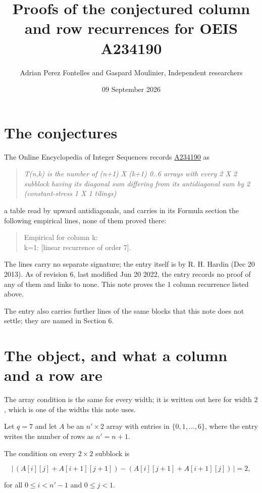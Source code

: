 \documentclass[11pt]{article}
\title{Proofs of the conjectured column and row recurrences for OEIS A234190}
\author{Adrian Perez Fontelles and Gaspard Moulinier, Independent researchers}
\date{09 September 2026}
\theoremstyle{definition}
\begin{document}
\maketitle
\section{The conjectures}

The Online Encyclopedia of Integer Sequences records \href{https://oeis.org/A234190}{A234190} as

\begin{quote}\itshape T(n,k) is the number of (n+1) X (k+1) 0..6 arrays with every 2 X 2 subblock having its diagonal sum differing from its antidiagonal sum by 2 (constant-stress 1 X 1 tilings)\end{quote}

a table read by upward antidiagonals, and carries in its Formula section the following empirical lines, none of them proved there:

\begin{quote}\ttfamily Empirical for column k:\\
k=1: [linear recurrence of order 7].\end{quote}

The lines carry no separate signature; the entry itself is by R. H. Hardin (Dec 20 2013). As of revision 6, last modified Jun 20 2022, the entry records no proof of any of them and links to none. This note proves the 1 column recurrence listed above.

The entry also carries further lines of the same blocks that this note does not settle; they are named in Section 6.

\section{The object, and what a column and a row are}

The array condition is the same for every width; it is written out here for width $2$, which is one of the widths this note uses.

Let $q = 7$ and let $A$ be an $n' \times 2$ array with entries in $\{0,1,\dots,6\}$, where the entry writes the number of rows as $n' = n + 1$.

The condition on every $2 \times 2$ subblock is

\[\bigl|\,(A[i][j] + A[i{+}1][j{+}1]) - (A[i][j{+}1] + A[i{+}1][j])\,\bigr| = 2,\]

for all $0 \le i < n'-1$ and $0 \le j < 1$.
\end{document}
